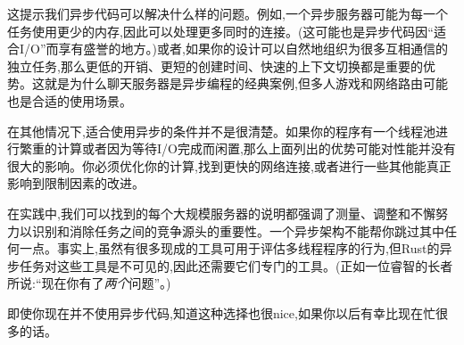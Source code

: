 这提示我们异步代码可以解决什么样的问题。例如,一个异步服务器可能为每一个任务使用更少的内存,因此可以处理更多同时的连接。(这可能也是异步代码因“适合I/O”而享有盛誉的地方。)或者,如果你的设计可以自然地组织为很多互相通信的独立任务,那么更低的开销、更短的创建时间、快速的上下文切换都是重要的优势。这就是为什么聊天服务器是异步编程的经典案例,但多人游戏和网络路由可能也是合适的使用场景。

在其他情况下,适合使用异步的条件并不是很清楚。如果你的程序有一个线程池进行繁重的计算或者因为等待I/O完成而闲置,那么上面列出的优势可能对性能并没有很大的影响。你必须优化你的计算,找到更快的网络连接,或者进行一些其他能真正影响到限制因素的改进。

在实践中,我们可以找到的每个大规模服务器的说明都强调了测量、调整和不懈努力以识别和消除任务之间的竞争源头的重要性。一个异步架构不能帮你跳过其中任何一点。事实上,虽然有很多现成的工具可用于评估多线程程序的行为,但Rust的异步任务对这些工具是不可见的,因此还需要它们专门的工具。(正如一位睿智的长者所说:“现在你有了\emph{两个}问题”。)

即使你现在并不使用异步代码,知道这种选择也很nice,如果你以后有幸比现在忙很多的话。
